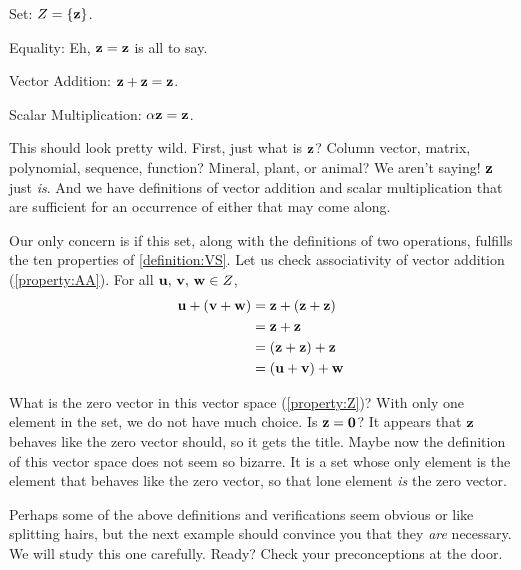 \documentclass{ximera}
\begin{document}
\begin{example}

  Set: $Z=\left\{\mathbf{z}\right\}$.

  Equality: Eh, $\mathbf{z} = \mathbf{z}$ is all to say.

  Vector Addition:  $\mathbf{z}+\mathbf{z}=\mathbf{z}$.

  Scalar Multiplication: $\alpha\mathbf{z}=\mathbf{z}$.

  This should look pretty wild.  First, just what is $\mathbf{z}$?
  Column vector, matrix, polynomial, sequence, function?  Mineral,
  plant, or animal?  We aren't saying!  $\mathbf{z}$ just \textit{is}.
  And we have definitions of vector addition and scalar multiplication
  that are sufficient for an occurrence of either that may come along.

  Our only concern is if this set, along with the definitions of two
  operations, fulfills the ten properties of \ref{definition:VS}.  Let
  us check associativity of vector addition (\ref{property:AA}).  For
  all $\mathbf{u},\,\mathbf{v},\,\mathbf{w}\in Z$,
  \begin{align*}
    \mathbf{u}+(\mathbf{v}+\mathbf{w})
    &=\mathbf{z}+(\mathbf{z}+\mathbf{z})\\
    &=\mathbf{z}+\mathbf{z}\\
    &=(\mathbf{z}+\mathbf{z})+\mathbf{z}\\
    &=(\mathbf{u}+\mathbf{v})+\mathbf{w}
  \end{align*}

  What is the zero vector in this vector space (\ref{property:Z})?
  With only one element in the set, we do not have much choice.  Is
  $\mathbf{z}=\mathbf{0}$?  It appears that $\mathbf{z}$ behaves like the
  zero vector should, so it gets the title.  Maybe now the definition
  of this vector space does not seem so bizarre.  It is a set whose
  only element is the element that behaves like the zero vector, so
  that lone element \textit{is} the zero vector.
\end{example}

Perhaps some of the above definitions and verifications seem obvious
or like splitting hairs, but the next example should convince you that
they \textit{are} necessary.  We will study this one carefully.
Ready?  Check your preconceptions at the door.
\end{document}
